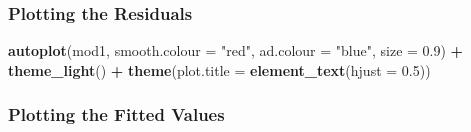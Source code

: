 \documentclass[12pt,]{article}
\newenvironment{Shaded}{\begin{snugshade}}{\end{snugshade}}
\newcommand{\KeywordTok}[1]{\textcolor[rgb]{0.13,0.29,0.53}{\textbf{#1}}}
\newcommand{\DataTypeTok}[1]{\textcolor[rgb]{0.13,0.29,0.53}{#1}}
\newcommand{\FloatTok}[1]{\textcolor[rgb]{0.00,0.00,0.81}{#1}}
\newcommand{\StringTok}[1]{\textcolor[rgb]{0.31,0.60,0.02}{#1}}
\newcommand{\OperatorTok}[1]{\textcolor[rgb]{0.81,0.36,0.00}{\textbf{#1}}}
\newcommand{\NormalTok}[1]{#1}
\begin{document}
\subsubsection{Plotting the Residuals}\label{plotting-the-residuals}

\begin{Shaded}
\begin{Highlighting}[]
\KeywordTok{autoplot}\NormalTok{(mod1, }\DataTypeTok{smooth.colour =} \StringTok{"red"}\NormalTok{, }\DataTypeTok{ad.colour =} \StringTok{"blue"}\NormalTok{, }\DataTypeTok{size =} \FloatTok{0.9}\NormalTok{) }\OperatorTok{+}\StringTok{ }\KeywordTok{theme_light}\NormalTok{() }\OperatorTok{+}\StringTok{ }
\StringTok{    }\KeywordTok{theme}\NormalTok{(}\DataTypeTok{plot.title =} \KeywordTok{element_text}\NormalTok{(}\DataTypeTok{hjust =} \FloatTok{0.5}\NormalTok{))}
\end{Highlighting}
\end{Shaded}

\subsubsection{Plotting the Fitted
Values}\label{plotting-the-fitted-values}
\end{document}
